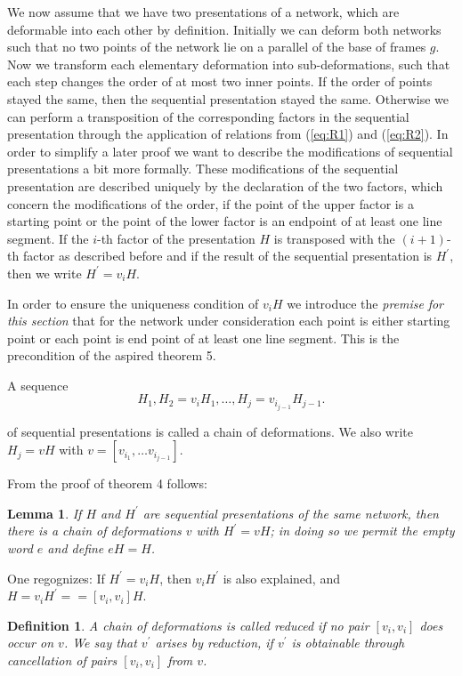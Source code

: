 \documentclass{article}
\newtheorem{lemma}{Lemma}
\newtheorem*{definition}{Definition}
\begin{document}
We now assume that we have two presentations of a network, which are deformable into each other by definition. Initially we can deform both networks such that no two points of the network lie on a parallel of the base of frames $g$. 
Now we transform each elementary deformation into sub-deformations, such that each step changes the order of at most two inner points. 
If the order of points stayed the same, then the sequential presentation stayed the same. 
Otherwise we can perform a transposition of the corresponding factors in the sequential presentation through the application of relations from (\ref{eq:R1}) and (\ref{eq:R2}). 
In order to simplify a later proof we want to describe the modifications of sequential presentations a bit more formally. 
These modifications of the sequential presentation are described uniquely by the declaration of the two factors, which concern the modifications of the order, if the point of the upper factor is a starting point or the point of the lower factor is an endpoint of at least one line segment. 
If the $i$-th factor of the presentation $H$ is transposed with the $(i + 1)$-th factor as described before and if the result of the sequential presentation is $H^{'}$, then we write $H^{'} = v_{i} H$.

In order to ensure the uniqueness condition of $v_i H$ we introduce the \emph{premise} \emph{for this section} that for the network under consideration each point is either starting point or each point is end point of at least one line segment. 
This is the precondition of the aspired theorem 5.

A sequence 
\[
  H_1, H_2 = v_i H_1, \ldots , H_j = v_{i_{j-1}} H_{j-1}.
\]

of sequential presentations is called a chain of deformations. We also write $H_j = v H$ with $v = [v_{i_1}, \ldots v_{i_{j-1}}]$. 

From the proof of theorem 4 follows:

\begin{lemma}
If $H$ and $H^{'}$ are sequential presentations of the same network, then there is a chain of deformations $v$ with $H^{'} = v H$; in doing so we permit the empty word $e$ and define $eH = H$.
\end{lemma}

One regognizes: If $H^{'} = v_i H$, then $v_i H^{'}$ is also explained, and $H = v_i H^{'} == [v_i, v_i] H$.

\begin{definition}
A chain of deformations is called \emph{reduced} if no pair $[v_i, v_i]$ does occur on $v$. We say that $v^{'}$ arises by reduction, if $v^{'}$ is obtainable through cancellation of pairs $[v_i, v_i]$ from $v$.
\end{definition}
\end{document}
